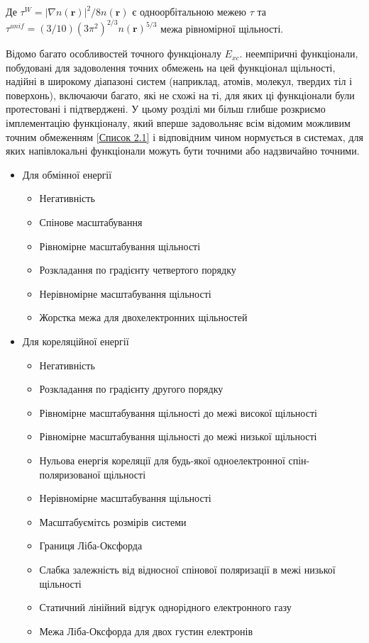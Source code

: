 Де $\tau^W = |\nabla{n(\textbf{r})}|^2/8n(\textbf{r})$ є одноорбітальною межею $\tau$ \newline та $\tau^{unif} = (3/10)(3\pi^2)^{2/3}n(\textbf{r})^{5/3}$ межа рівномірної щільності.

Відомо багато особливостей точного функціоналу $E_{xc}$. неемпіричні функціонали, побудовані для задоволення точних обмежень на цей функціонал щільності, надійні в широкому діапазоні систем (наприклад, атомів, молекул, твердих тіл і поверхонь), включаючи багато, які не схожі на ті, для яких ці функціонали були протестовані і підтверджені. У цьому розділі ми більш глибше розкриємо імплементацію функціоналу, який вперше задовольняє всім відомим можливим точним обмеженням \hyperref[lst:Constrains]{[Список 2.1]} і відповідним чином нормується в системах, для яких напівлокальні функціонали можуть бути точними або надзвичайно точними.

\begin{itemize}	
\label{lst:Constrains}
   \item Для обмінної енергії
   \begin{itemize}
     \item Негативність 
     \item Спінове масштабування
     \item Рівномірне масштабування щільності
     \item Розкладання по градієнту четвертого порядку
     \item Нерівномірне масштабування щільності
     \item Жорстка межа для двохелектронних щільностей
   \end{itemize}
   \item Для кореляційної енергії
   \begin{itemize}
   	  \item Негативність
   	  \item Розкладання по градієнту другого порядку
   	  \item Рівномірне масштабування щільності до межі високої щільності
   	  \item Рівномірне масштабування щільності до межі низької щільності
   	  \item Нульова енергія кореляції для будь-якої одноелектронної спін-поляризованої щільності
   	  \item Нерівномірне масштабування щільності
   	  \item Масштабуємітсь розмірів системи
   	  \item Границя Ліба-Оксфорда
   	  \item Слабка залежність від відносної спінової поляризації в межі низької щільності
   	  \item Статичний лінійний відгук однорідного електронного газу
   	  \item Межа Ліба-Оксфорда для двох густин електронів
   	\end{itemize}
 \end{itemize}

